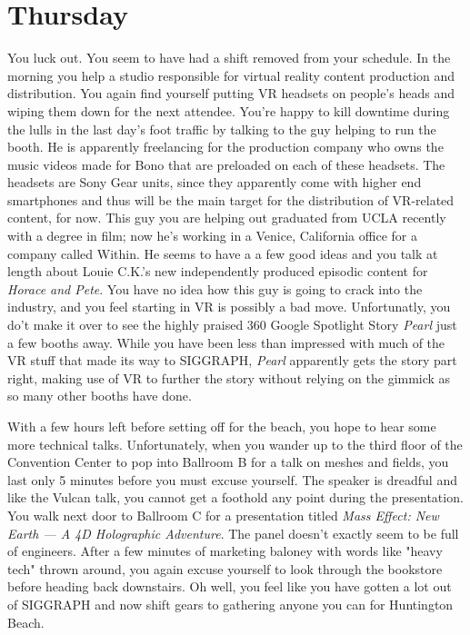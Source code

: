 \documentclass[../main.tex]{subfiles}
\begin{document}
\section{Thursday}

You luck out. You seem to have had a shift removed from your schedule. In the morning you help a studio responsible for virtual reality content production and distribution. You again find yourself putting VR headsets on people's heads and wiping them down for the next attendee. You're happy to kill downtime during the lulls in the last day's foot traffic by talking to the guy helping to run the booth. He is apparently freelancing for the production company who owns the music videos made for Bono that are preloaded on each of these headsets. The headsets are Sony Gear units, since they apparently come with higher end smartphones and thus will be the main target for the distribution of VR-related content, for now. This guy you are helping out graduated from UCLA recently with a degree in film; now he's working in a Venice, California office for a company called Within. He seems to have a a few good ideas and you talk at length about Louie C.K.'s new independently produced episodic content for \textit{Horace and Pete}. You have no idea how this guy is going to crack into the industry, and you feel starting in VR is possibly a bad move. Unfortunatly, you do't make it over to see the highly praised 360 Google Spotlight Story \textit{Pearl} just a few booths away. While you have been less than impressed with much of the VR stuff that made its way to SIGGRAPH, \textit{Pearl} apparently gets the story part right, making use of VR to further the story without relying on the gimmick as so many other booths have done.

With a few hours left before setting off for the beach, you hope to hear some more technical talks. Unfortunately, when you wander up to the third floor of the Convention Center to pop into Ballroom B for a talk on meshes and fields, you last only 5 minutes before you must excuse yourself. The speaker is dreadful and like the Vulcan talk, you cannot get a foothold any point during the presentation. You walk next door to Ballroom C for a presentation titled \textit{Mass Effect: New Earth --- A 4D Holographic Adventure}. The panel doesn't exactly seem to be full of engineers. After a few minutes of marketing baloney with words like "heavy tech" thrown around, you again excuse yourself to look through the bookstore before heading back downstairs. Oh well, you feel like you have gotten a lot out of SIGGRAPH and now shift gears to gathering anyone you can for Huntington Beach.
\end{document}
